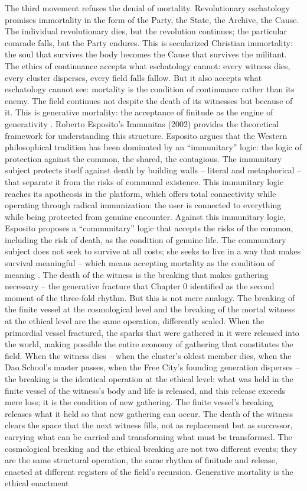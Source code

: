 The third movement refuses the denial of mortality. Revolutionary eschatology promises immortality in the form of the Party, the State, the Archive, the Cause. The individual revolutionary dies, but the revolution continues; the particular comrade falls, but the Party endures. This is secularized Christian immortality: the soul that survives the body becomes the Cause that survives the militant. The ethics of continuance accepts what eschatology cannot: every witness dies, every cluster disperses, every field falls fallow. But it also accepts what eschatology cannot see: mortality is the condition of continuance rather than its enemy. The field continues not despite the death of its witnesses but because of it. This is generative mortality: the acceptance of finitude as the engine of generativity \cite[pp.~109-140]{esposito_2002}. Roberto Esposito’s Immunitas (2002) provides the theoretical framework for understanding this structure. Esposito argues that the Western philosophical tradition has been dominated by an “immunitary” logic: the logic of protection against the common, the shared, the contagious. The immunitary subject protects itself against death by building walls – literal and metaphorical – that separate it from the risks of communal existence. This immunitary logic reaches its apotheosis in the platform, which offers total connectivity while operating through radical immunization: the user is connected to everything while being protected from genuine encounter. Against this immunitary logic, Esposito proposes a “communitary” logic that accepts the risks of the common, including the risk of death, as the condition of genuine life. The communitary subject does not seek to survive at all costs; she seeks to live in a way that makes survival meaningful – which means accepting mortality as the condition of meaning \cite[pp.~6-18, 48-78]{esposito_2002}. The death of the witness is the breaking that makes gathering necessary – the generative fracture that Chapter 0 identified as the second moment of the three-fold rhythm. But this is not mere analogy. The breaking of the finite vessel at the cosmological level and the breaking of the mortal witness at the ethical level are the same operation, differently scaled. When the primordial vessel fractured, the sparks that were gathered in it were released into the world, making possible the entire economy of gathering that constitutes the field. When the witness dies – when the cluster’s oldest member dies, when the Dao School’s master passes, when the Free City’s founding generation disperses – the breaking is the identical operation at the ethical level: what was held in the finite vessel of the witness’s body and life is released, and this release exceeds mere loss; it is the condition of new gathering. The finite vessel’s breaking releases what it held so that new gathering can occur. The death of the witness clears the space that the next witness fills, not as replacement but as successor, carrying what can be carried and transforming what must be transformed. The cosmological breaking and the ethical breaking are not two different events; they are the same structural operation, the same rhythm of finitude and release, enacted at different registers of the field’s recursion. Generative mortality is the ethical enactment 